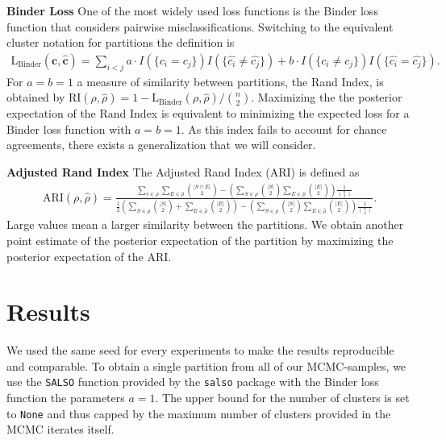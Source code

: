 \documentclass[12pt,a4paper]{article}
\begin{document}
\textbf{Binder Loss} One of the most widely used loss functions is the Binder loss function that considers pairwise misclassifications. Switching to the equivalent cluster notation for partitions the definition is
\begin{align*}
    \text{L}_{\text{Binder}} (\mathbf{c}, \mathbf{\hat{c}} ) = \sum_{i<j} a \cdot  I (\{ c_i = c_j \}) I (\{ \hat{c_i} \neq \hat{c_j} \} ) +  b \cdot I (\{c_i \neq c_j \}) I (\{ \hat{c_i} = \hat{c_j} \}).
\end{align*}
For $a=b=1$ a measure of similarity between partitions, the Rand Index, is obtained by $\text{RI}(\rho, \hat{\rho}) = 1 -  \text{L}_{\text{Binder}}(\rho, \hat{\rho}) / \binom{n}{2}$. Maximizing the the posterior expectation of the Rand Index is equivalent to minimizing the expected loss for a Binder loss function with $a=b=1$. As this index fails to account for chance agreements, there exists a generalization that we will consider.

\textbf{Adjusted Rand Index} The Adjusted Rand Index (ARI) is defined as
\begin{align*}
    \text{ARI} (\rho, \hat{\rho}) = \frac{ \sum_{s \in \rho} \sum_{E \in \hat{\rho}} \binom{| S \cap E |}{2} - \left( \sum_{S \in \rho} \binom{|S|}{2} \sum_{E \in \hat{\rho}} \binom{|E|}{2} \right) \frac{1}{\binom{n}{2}}} {\frac{1}{2} \left( \sum_{S \in \rho} \binom{|S|}{2} + \sum_{E \in \hat{\rho}} \binom{|E|}{2} \right) - \left(\sum_{S \in \rho} \binom{|S|}{2} \sum_{E \in \hat{\rho}} \binom{|E|}{2} \right) \frac{1}{\binom{n}{2}}}.
\end{align*}
Large values mean a larger similarity between the partitions. We obtain another point estimate of the posterior expectation of the partition by maximizing the posterior expectation of the ARI.

\newpage

\section{Results}
We used the same seed for every experiments to make the results
reproducible and comparable. To obtain a single partition from all of our
MCMC-samples, we use the \texttt{SALSO} function provided by the
\texttt{salso} package with the Binder loss function
the parameters $a=1$. The upper bound for the number of clusters is set to 
\texttt{None} and thus capped by the maximum number of clusters provided in
the MCMC iterates itself.
\end{document}
